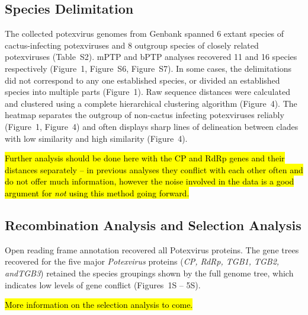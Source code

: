 \documentclass[fleqn,10pt,lineno]{wlpeerj}
\begin{document}
\subsection*{Species Delimitation}
The collected potexvirus genomes from Genbank spanned 6 extant species of cactus-infecting potexviruses and 8 outgroup species of closely related potexviruses (Table~S2).
mPTP and bPTP analyses recovered 11 and 16 species respectively (Figure~1, Figure~S6, Figure~S7).
In some cases, the delimitations did not correspond to any one established species, or divided an established species into multiple parts (Figure~1).
Raw sequence distances were calculated and clustered using a complete hierarchical clustering algorithm (Figure~4). 
The heatmap separates the outgroup of non-cactus infecting potexviruses reliably (Figure~1, Figure~4) and often displays sharp lines of delineation between clades with low similarity and high similarity (Figure~4). 

\hl{Further analysis should be done here with the CP and RdRp genes and their distances separately -- in previous analyses they conflict with each other often and do not offer much information, however the noise involved in the data is a good argument for \textit{not} using this method going forward.}


\subsection*{Recombination Analysis and Selection Analysis}
Open reading frame annotation recovered all Potexvirus proteins.
The gene trees recovered for the five major \textit{Potexvirus} proteins (\textit{CP, RdRp, TGB1, TGB2, \textit{and}TGB3}) retained the species groupings shown by the full genome tree, which indicates low levels of gene conflict (Figures~1S -- 5S).


\hl{More information on the selection analysis to come.}


\end{document}
